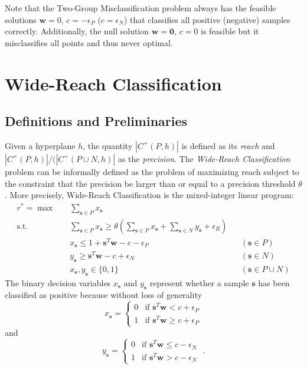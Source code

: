 \documentclass[11pt]{article}
\theoremstyle{definition}
\newcommand{\vect}[1]{\mathbf{#1}}
\newcommand{\sv}[1]{_{\vect{#1}}}
\begin{document}
Note that the Two-Group Misclassification problem always has the feasible
solutions $\vect{w} = 0$, $c = - \epsilon_P$ ($c = \epsilon_N$)
that classifies all positive (negative) samples correctly.
Additionally, the null solution $\vect{w} = \vect{0}$, $c = 0$ is feasible but 
it misclassifies all points and thus never optimal.


\section{Wide-Reach Classification}
\subsection{Definitions and Preliminaries}
Given a hyperplane $h$, the quantity $|C^+(P, h)|$ is defined as its {\em reach\/}
and $|C^+(P, h)| / (|C^+(P \cup N, h)|$ as the {\em precision\/}.
The {\em Wide-Reach Classification\/} problem can be informally defined
as the problem of maximizing reach subject to the constraint that the precision
be larger than or equal to a precision threshold $\theta$.
More precisely, Wide-Reach Classification is the mixed-integer linear program:
\begin{subequations}
\label{eq:widereach}
\begin{align}
r^* = \max\quad & 
\sum_{\vect{s} \in P} x\sv{s} \\
\label{eq:precisionconstraint}
\text{s.t.}\quad & 
\sum_{\vect{s} \in P} x\sv{s} \geq 
\theta \left( 
\sum_{\vect{s} \in P} x\sv{s} + \sum_{\vect{s} \in N} y\sv{s} + \epsilon_R \right) \\
& x\sv{s} \leq 1 + \vect{s}^T \vect{w} - c - \epsilon_P & & (\vect{s} \in P) \\
& y\sv{s} \geq \vect{s}^T \vect{w} - c + \epsilon_N & & (\vect{s} \in N) \\
& x\sv{s}, y\sv{s} \in \{ 0, 1 \} & & (\vect{s} \in P \cup N) 
\end{align}
\end{subequations}
The binary decision variables $x\sv{s}$ and $y\sv{s}$ represent whether a
sample $\vect{s}$ has been classified as positive because without loss of generality
$$x\sv{s} = \begin{cases}
0 & \text{if } \vect{s}^T \vect{w} < c + \epsilon_P \\
1 & \text{if } \vect{s}^T \vect{w} \geq c + \epsilon_P 
\end{cases}$$
and
$$y\sv{s} = \begin{cases}
0 & \text{if } \vect{s}^T \vect{w} \leq c - \epsilon_N \\
1 & \text{if } \vect{s}^T \vect{w} > c - \epsilon_N 
\end{cases}\;.$$
\end{document}
